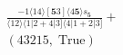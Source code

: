 \documentclass[varwidth, border=5pt]{standalone}
\begin{document}
\begin{my}
$\begin{gathered}
\scriptscriptstyle\frac{-1⟨14⟩[𝟓3]⟨4𝟓⟩s_{𝟓}}{⟨12⟩⟨1|2+4|3]⟨4|1+2|3]} +\\
\scriptscriptstyle(43215,\;\text{True}) \phantom{+}
\end{gathered}$
\end{my}
\end{document}
